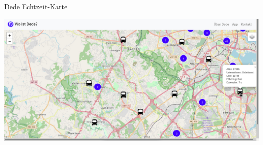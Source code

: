 
\begin{frame}{Dede Echtzeit-Karte}
  \begin{center}
    \includegraphics{dede/dede_real-time_map_crop}
  \end{center}
\end{frame}

